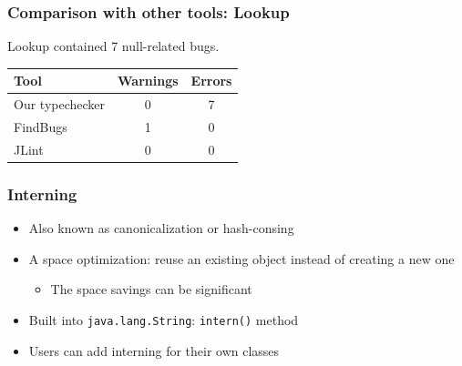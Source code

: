 \documentclass{beamer}
\begin{document}


\setlength{\tabcolsep}{2.7\tabcolsep}
\frame
{
  \frametitle{Comparison with other tools: Lookup}

  \begin{center}
  Lookup contained 7 null-related bugs.
  \end{center}

  \begin{block}{}
  \begin{tabular}{l|c|c}
  \textbf{Tool} & \textbf{Warnings} & \textbf{Errors} \\ \hline
  Our typechecker & 0 & 7 \\ \hline
  FindBugs & 1 & 0 \\ \hline
  JLint & 0 & 0 
  \end{tabular}
  \end{block}{}
}

\frame
{
  \frametitle{Interning}
  \begin{itemize}
  \item Also known as canonicalization or hash-consing
  \item A space optimization: reuse an existing object instead of creating a new one
  \begin{itemize}
  \item The space savings can be significant
  \end{itemize}
  \item Built into \texttt{java.lang.String}: \texttt{intern()} method
  \item Users can add interning for their own classes
  \end{itemize}
}
\end{document}
